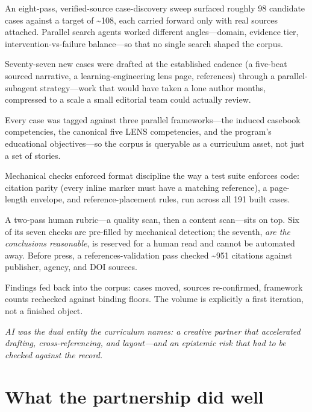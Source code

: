 \documentclass[11pt]{article}
\newcommand{\pullquote}[1]{%
  \begin{center}\begin{minipage}{0.86\linewidth}
  \color{lensquote}\itshape\large\RaggedRight #1
  \end{minipage}\end{center}}
\begin{document}
\begin{description}[leftmargin=0em,itemsep=3pt,topsep=3pt,font=\color{lensink}\bfseries]
  \item[Discover.] An eight-pass, verified-source case-discovery sweep surfaced roughly 98 candidate cases against a target of \textasciitilde108, each carried forward only with real sources attached. Parallel search agents worked different angles---domain, evidence tier, intervention-vs-failure balance---so that no single search shaped the corpus.
  \item[Draft.] Seventy-seven new cases were drafted at the established cadence (a five-beat sourced narrative, a learning-engineering lens page, references) through a parallel-subagent strategy---work that would have taken a lone author months, compressed to a scale a small editorial team could actually review.
  \item[Anchor.] Every case was tagged against three parallel frameworks---the induced casebook competencies, the canonical five LENS competencies, and the program's educational objectives---so the corpus is queryable as a curriculum asset, not just a set of stories.
  \item[Instrument.] Mechanical checks enforced format discipline the way a test suite enforces code: citation parity (every inline marker must have a matching reference), a page-length envelope, and reference-placement rules, run across all 191 built cases.
  \item[Verify.] A two-pass human rubric---a quality scan, then a content scan---sits on top. Six of its seven checks are pre-filled by mechanical detection; the seventh, \emph{are the conclusions reasonable}, is reserved for a human read and cannot be automated away. Before press, a references-validation pass checked \textasciitilde951 citations against publisher, agency, and DOI sources.
  \item[Iterate.] Findings fed back into the corpus: cases moved, sources re-confirmed, framework counts rechecked against binding floors. The volume is explicitly a first iteration, not a finished object.
\end{description}

\pullquote{AI was the dual entity the curriculum names: a creative partner that accelerated drafting, cross-referencing, and layout---and an epistemic risk that had to be checked against the record.}

\section{What the partnership did well}
\end{document}
